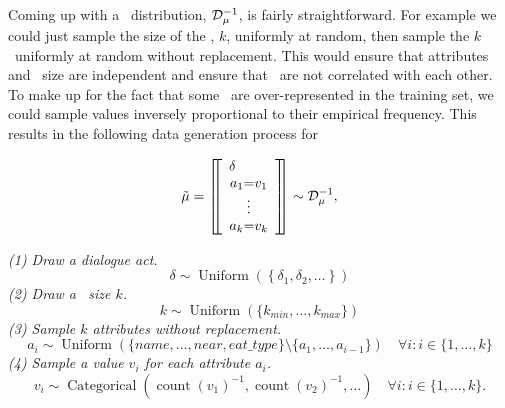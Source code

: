 Coming up with a \meaningrepresentation~distribution, $\mathcal{D}_{\mu}^{-1}$, is
fairly straightforward.  For example we could just sample the size of the
\meaningrepresentation, $k$, uniformly at random, then sample the $k$
\attributes~uniformly at random without replacement. This would ensure that
attributes and \meaningrepresentation~size are independent and ensure that
\attributes~are not correlated with each other. To make up for the fact that
some \attributevalues~are over-represented in the training set, we could sample
values inversely proportional to their empirical frequency. This results in the
following data generation process for 
\begin{singlespace}\[
        \tilde{\mu}  = \left[\!\!\left[ 
                \begin{array}{c} 
                    \delta~~~~~~~ \\
                    \textrm{$a_1$=$v_1$} \\ \vdots \\ \textrm{$a_k$=$v_k$}  
                \end{array}  
\right]\!\!\right] \sim \mathcal{D}_{\mu}^{-1},\]\end{singlespace}
{
    \begin{minipage}{0.9\textwidth}
        \begin{singlespace}
            \noindent \textit{(1) Draw a dialogue act.}
            \[
                \delta \sim \operatorname{Uniform}(\left\{\delta_1, \delta_2,\ldots\right\}) 
            \]
            \noindent \textit{(2) Draw a \meaningrepresentation~size $k$.}
            \[
                k \sim \operatorname{Uniform}(\{k_{min}, \ldots, k_{max}\}) 
            \]
            \noindent \textit{(3) Sample $k$ attributes without replacement.}
            \[
            a_i  \sim \operatorname{Uniform}(\{name, \ldots, near, eat\_type\}\setminus\{a_1,\ldots,a_{i-1}\}) \quad \forall i: i \in  \{1,\ldots, k\}\]
            \noindent \textit{(4) Sample a value $v_i$ for each attribute $a_i$.}
            \[ v_i  \sim \operatorname{Categorical}\left(\operatorname{count}(v_1)^{-1}, \operatorname{count}(v_2)^{-1},\ldots\right)  \quad \forall i: i \in \{1,\ldots,k\}. \]
        \end{singlespace}
\end{minipage}}

